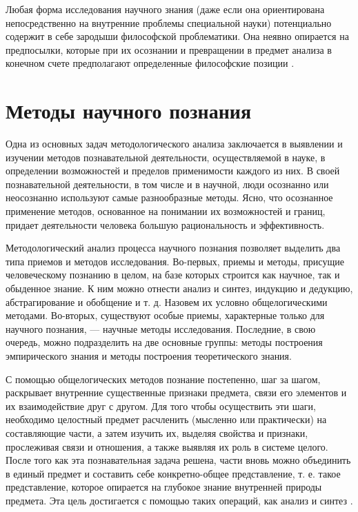 Любая форма исследования научного знания (даже если она ориентирована непосредственно на внутренние проблемы специальной науки) потенциально содержит в себе зародыши философской проблематики. Она неявно опирается на предпосылки, которые при их осознании и превращении в предмет анализа в конечном счете предполагают определенные философские позиции \cite{mir:philosophy} \cite{mir:philosophy}.

\section{Методы научного познания}

Одна из основных задач методологического анализа заключается в выявлении и изучении методов познавательной деятельности, осуществляемой в науке, в определении возможностей и пределов применимости каждого из них. В своей познавательной деятельности, в том числе и в научной, люди осознанно или неосознанно используют самые разнообразные методы. Ясно, что осознанное применение методов, основанное на понимании их возможностей и границ, придает деятельности человека большую рациональность и эффективность.

Методологический анализ процесса научного познания позволяет выделить два типа приемов и методов исследования. Во-первых, приемы и методы, присущие человеческому познанию в целом, на базе которых строится как научное, так и обыденное знание. К ним можно отнести анализ и синтез, индукцию и дедукцию, абстрагирование и обобщение и т. д. Назовем их условно общелогическими методами. Во-вторых, существуют особые приемы, характерные только для научного познания, --- научные методы исследования. Последние, в свою очередь, можно подразделить на две основные группы: методы построения эмпирического знания и методы построения теоретического знания.

С помощью общелогических методов познание постепенно, шаг за шагом, раскрывает внутренние существенные признаки предмета, связи его элементов и их взаимодействие друг с другом. Для того чтобы осуществить эти шаги, необходимо целостный предмет расчленить (мысленно или практически) на составляющие части, а затем изучить их, выделяя свойства и признаки, прослеживая связи и отношения, а также выявляя их роль в системе целого. После того как эта познавательная задача решена, части вновь можно объединить в единый предмет и составить себе конкретно-общее представление, т. е. такое представление, которое опирается на глубокое знание внутренней природы предмета. Эта цель достигается с помощью таких операций, как анализ и синтез \cite{mir:philosophy}.

